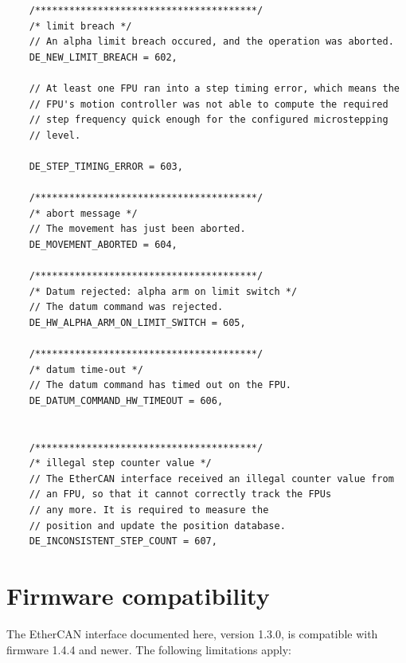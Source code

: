 \documentclass[11pt,a4paper]{scrartcl}
\begin{document}
\begin{verbatim}
    /***************************************/
    /* limit breach */
    // An alpha limit breach occured, and the operation was aborted.
    DE_NEW_LIMIT_BREACH = 602,

    // At least one FPU ran into a step timing error, which means the
    // FPU's motion controller was not able to compute the required
    // step frequency quick enough for the configured microstepping
    // level.

    DE_STEP_TIMING_ERROR = 603,

    /***************************************/
    /* abort message */
    // The movement has just been aborted.
    DE_MOVEMENT_ABORTED = 604,

    /***************************************/
    /* Datum rejected: alpha arm on limit switch */
    // The datum command was rejected.
    DE_HW_ALPHA_ARM_ON_LIMIT_SWITCH = 605,

    /***************************************/
    /* datum time-out */
    // The datum command has timed out on the FPU.
    DE_DATUM_COMMAND_HW_TIMEOUT = 606,


    /***************************************/
    /* illegal step counter value */
    // The EtherCAN interface received an illegal counter value from
    // an FPU, so that it cannot correctly track the FPUs
    // any more. It is required to measure the
    // position and update the position database.
    DE_INCONSISTENT_STEP_COUNT = 607,

\end{verbatim}

\section{Firmware compatibility}
\label{sec:firmware_compatibility}

The EtherCAN interface documented here, version 1.3.0, is compatible with firmware
1.4.4 and newer. The following limitations apply:
\end{document}
